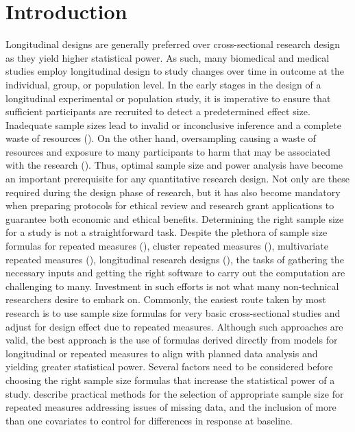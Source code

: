 \documentclass[oupdraft]{bio}
\begin{document}
\section{Introduction}
\label{sec1}
Longitudinal designs are generally preferred over cross-sectional research design as they yield higher statistical power. As such, many biomedical and medical studies employ longitudinal design to study changes over time in outcome at the individual, group, or population level. In the early stages in the design of a longitudinal experimental or population study, it is imperative to ensure that sufficient participants are recruited to detect a predetermined effect size.  Inadequate sample sizes lead to invalid or inconclusive inference and a complete waste of resources (\cite{Lu_Methrotra_Liu(2009),Yan_Su(2006)}). On the other hand,  oversampling causing a waste of resources and exposure to many participants to harm that may be associated with the research (\cite{Lu_Methrotra_Liu(2009)}). Thus, optimal sample size and power analysis have become an important prerequisite for any quantitative research design. Not only are these required during the design phase of research, but it has also become mandatory when preparing protocols for ethical review and research grant applications to guarantee both economic and ethical benefits. 
Determining the right sample size for a study is not a straightforward task. Despite the plethora of sample size formulas for repeated measures (\cite{Overall_Doyle(1994),Lui(1992),Rochon(1991), Guo_etal(2013)}), cluster repeated measures (\cite{Liu_Shih_Gehan(2002)}), multivariate repeated measures (\cite{Vonesh_Schork(1986),Guo_Johnson(1996)}), longitudinal research designs (\cite{Lefante(1990)}), the tasks of gathering the necessary inputs and getting the right software to carry out the computation are challenging to many. Investment in such efforts is not what many non-technical researchers desire to embark on. Commonly, the easiest route taken by most research is to use sample size formulas for very basic cross-sectional studies and adjust for design effect due to repeated measures. Although such approaches are valid, the best approach is the use of formulas derived directly from models for longitudinal or repeated measures to align with planned data analysis and yielding greater statistical power. 
Several factors need to be considered before choosing the right sample size formulas that increase the statistical power of a study. \cite{Guo_etal(2013)} describe practical methods for the selection of appropriate sample size for repeated measures addressing issues of missing data, and the inclusion of more than one covariates to control for differences in response at baseline. 
	
\end{document}
